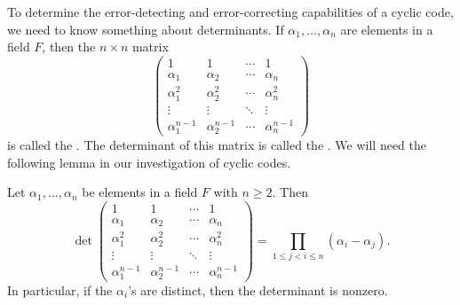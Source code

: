 To determine the error-detecting and error-correcting capabilities of a cyclic code, we need to know something about determinants.  If $\alpha_1, \ldots, \alpha_n$ are elements in a field $F$, then the $n 
\times n$ matrix  
\[
\begin{pmatrix}
1          & 1          & \cdots & 1 \\
\alpha_1   & \alpha_2   & \cdots & \alpha_n \\
\alpha_1^2 & \alpha_2^2 & \cdots & \alpha_n^2 \\
\vdots     & \vdots     & \ddots & \vdots \\
\alpha_1^{n-1} & \alpha_2^{n-1} & \cdots & \alpha_n^{n-1} 
\end{pmatrix}
\]
is called the .  The
determinant of this matrix is called the .  We will need the following lemma in our investigation of cyclic codes.

\begin{lemma}\label{finite:V_det_lemma}
Let $\alpha_1, \ldots, \alpha_n$ be elements in a field $F$ with $n \geq 2$.  Then
\[
\det
\begin{pmatrix}
1              & 1              & \cdots & 1 \\
\alpha_1       & \alpha_2       & \cdots & \alpha_n \\
\alpha_1^2     & \alpha_2^2     & \cdots & \alpha_n^2 \\
\vdots         & \vdots         & \ddots & \vdots \\
\alpha_1^{n-1} & \alpha_2^{n-1} & \cdots & \alpha_n^{n-1} 
\end{pmatrix}
= 
\prod_{1 \leq j < i \leq n} (\alpha_i - \alpha_j).
\]
In particular, if the $\alpha_i$'s are distinct, then the determinant is nonzero.
\end{lemma}


